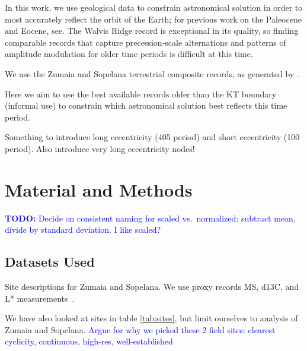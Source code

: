 \documentclass[draft]{agujournal2019}
\newcommand{\ijk}{\textcolor{blue}}
\begin{document}
In this work, we use geological data to constrain astronomical solution in order to most accurately reflect the orbit of the Earth; for previous work on the Paleocene and Eocene, see.
The Walvis Ridge record is exceptional in its quality, so finding comparable records that capture precession-scale alternations and patterns of amplitude modulation for older time periods is difficult at this time.

We use the Zumaia and Sopelana terrestrial composite records, as generated by .

Here we aim to use the best available records older than the \gls{KT} boundary (informal use) to constrain which astronomical solution best reflects this time period.

Something to introduce long eccentricity (\qty{405}{\kiloyear} period) and short eccentricity (\qty{100}{\kiloyear} period).
Also introduce very long eccentricity nodes!



\section{Material and Methods}\label{sec:mm}

\ijk{\textbf{TODO:} Decide on consistent naming for scaled vs.\ normalized: subtract mean, divide by standard deviation. I like scaled?}

\subsection{Datasets Used}\label{sec:data}

Site descriptions for Zumaia and Sopelana.
We use proxy records \gls{MS}, \gls{d13C}, and \gls{L*} measurements~\cite{Batenburg2012,Batenburg2014}.

We have also looked at sites in table \cref{tab:sites}, but limit ourselves to analysis of Zumaia and Sopelana.
\ijk{Argue for why we picked these 2 field sites: clearest cyclicity, continuous, high-res, well-established}
\end{document}
